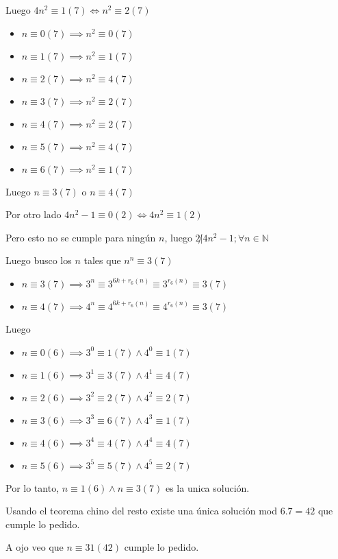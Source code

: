 Luego $ 4n^2 \equiv 1 (7) \iff n^2 \equiv 2(7) $
\begin{itemize}
    \item $ n \equiv 0(7) \implies n^2 \equiv 0 (7) $
    \item $ n \equiv 1(7) \implies n^2 \equiv 1 (7)$
    \item $ n \equiv 2(7) \implies n^2 \equiv 4 (7)$
    \item $ n \equiv 3(7) \implies n^2 \equiv 2 (7)$
    \item $ n \equiv 4(7) \implies n^2 \equiv 2 (7)$
    \item $ n \equiv 5(7) \implies n^2 \equiv 4 (7)$
    \item $ n \equiv 6(7) \implies n^2 \equiv 1 (7)$
\end{itemize}
Luego $ n \equiv 3(7) $ o $ n \equiv 4(7) $

Por otro lado $ 4n^2 - 1 \equiv 0 (2) \iff 4n^2 \equiv 1 (2) $

Pero esto no se cumple para ningún $n$, luego $ 2 \not | 4n^2 - 1; \forall n \in \mathbb{N} $

Luego busco los $n$ tales que $ n^n \equiv 3(7) $
\begin{itemize}
    \item $ n \equiv 3(7) \implies 3^n \equiv 3^{6k + r_6(n)} \equiv 3^{r_6(n)} \equiv 3(7) $
    \item $ n \equiv 4(7) \implies 4^n \equiv 4^{6k + r_6(n)} \equiv 4^{r_6(n)} \equiv 3(7) $
\end{itemize}
Luego
\begin{itemize}
    \item $ n \equiv 0(6) \implies 3^0 \equiv 1 (7) \wedge 4^0 \equiv 1 (7) $
    \item $ n \equiv 1(6) \implies 3^1 \equiv 3 (7) \wedge 4^1 \equiv 4 (7) $
    \item $ n \equiv 2(6) \implies 3^2 \equiv 2 (7) \wedge 4^2 \equiv 2 (7) $
    \item $ n \equiv 3(6) \implies 3^3 \equiv 6 (7) \wedge 4^3 \equiv 1 (7) $
    \item $ n \equiv 4(6) \implies 3^4 \equiv 4 (7) \wedge 4^4 \equiv 4 (7) $
    \item $ n \equiv 5(6) \implies 3^5 \equiv 5 (7) \wedge 4^5 \equiv 2 (7) $
\end{itemize}
Por lo tanto, $ n \equiv 1(6) \wedge n \equiv 3(7) $ es la unica solución.

Usando el teorema chino del resto existe una única solución mod $6.7 = 42 $ que cumple lo pedido.

A ojo veo que $ n \equiv 31(42) $ cumple lo pedido.


